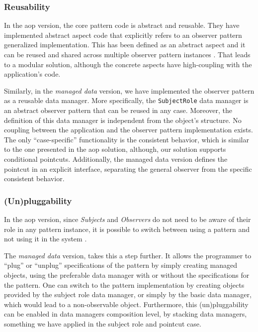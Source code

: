 \subsubsection{Reusability}
In the \ac{aop} version, the core pattern code is abstract and reusable. 
They have implemented abstract aspect code that explicitly refers to an observer pattern generalized implementation.
This has been defined as an abstract aspect and it can be reused and shared across multiple observer pattern instances \cite{hannemann2005role}.
That leads to a modular solution, although the concrete aspects have high-coupling with the application's code.

Similarly, in the \textit{managed data} version, we have implemented the observer pattern as a reusable data manager.
More specifically, the \texttt{SubjectRole} data manager is an abstract observer pattern that can be reused in any case.
Moreover, the definition of this data manager is independent from the object's structure.
No coupling between the application and the observer pattern implementation exists.
The only ``case-specific'' functionality is the consistent behavior, which is similar to the one presented in the \ac{aop} solution, although, our solution supports conditional pointcuts.
Additionally, the managed data version defines the pointcut in an explicit interface, separating the general observer from the specific consistent behavior.

\subsubsection{(Un)pluggability}
In the \ac{aop} version, since \textit{Subjects} and \textit{Observers} do not need to be aware of their role in any pattern instance, it is possible to switch between using a pattern and not using it in the system \cite{hannemann2005role}. 

The \textit{managed data} version, takes this a step further.
It allows the programmer to ``plug'' or ``unplug'' specifications of the pattern by simply creating managed objects, using the preferable data manager with or without the specifications for the pattern.
One can switch to the pattern implementation by creating objects provided by the subject role data manager, or simply by the basic data manager, which would lead to a non-observable object.
Furthermore, this (un)pluggability can be enabled in data managers composition level, by stacking data managers, something we have applied in the subject role and pointcut case.

